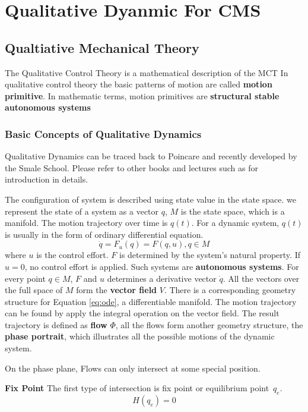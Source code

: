 \section{Qualitative Dyanmic For CMS}
\subsection{Qualtiative Mechanical Theory}
The Qualitative Control Theory is a mathematical description of the MCT
In qualitative control theory the  basic patterns of motion are called \textbf{motion primitive}.
In mathematic terms, motion primitives are \textbf{structural stable autonomous systems}

\subsubsection{Basic Concepts of Qualitative Dynamics} 
Qualitative Dynamics can be traced back to Poincare\citep{Poincar'e1899,Poincar'e1885} and recently developed by the Smale School.
Please refer to other books and lectures  such as \citep{abraham1978foundations}for introduction in details.

The configuration of system is described using state value in the state space.
we represent the state of a system as a vector $q$,  $M$ is the state space, which is a manifold.
The motion trajectory over time is $q(t)$.
For a dynamic system, $q(t)$ is usually in the form of  ordinary differential equation. 
\begin{equation}
\dot{q}=F_{u}(q)=F(q,u),q\in M
\label{eq:ode}
\end{equation}
where $u$ is the control effort. 
$F$ is determined by the system's natural property.
If $u=0$,  no control effort is applied.
Such systems are \textbf{autonomous systems}.
For every point $q \in M$, 
$F$ and $u$ determines a derivative vector $\dot{q}$. 
All the vectors over the full space of $M$ form the \textbf{vector field} $V$. 
There is a corresponding geometry structure for Equation \eqref{eq:ode}, a differentiable manifold.
The motion trajectory can be found by apply the integral operation on the vector field.
The result trajectory is defined as \textbf{flow} $\Phi$, all the flows form another geometry structure,
the \textbf{phase portrait}, which illustrates all the possible motions of the dynamic system.


On the phase plane,
Flows can only intersect at some special position.


\textbf{Fix Point} The first type of intersection is fix point or equilibrium point~$q_{e}$.
\[
	H(q_{e})=0
\]

